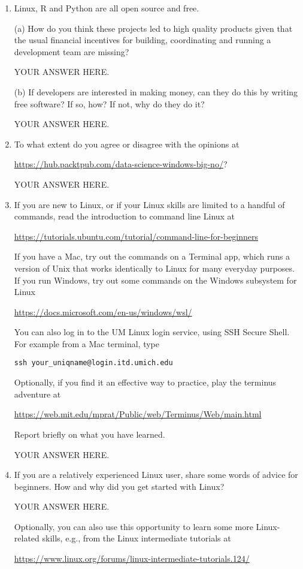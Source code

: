 \documentclass[12pt]{article}
\begin{document}
\begin{enumerate}

\item Linux, R and Python are all open source and free. 

(a) How do you think these projects led to high quality products given that the  usual financial incentives for building, coordinating and running a development team are missing?

YOUR ANSWER HERE.

(b) If developers are interested in making money, can they do this by writing free software? If so, how? If not, why do they do it?

YOUR ANSWER HERE.
  
\item To what extent do you agree or disagree with the opinions at

\url{https://hub.packtpub.com/data-science-windows-big-no/}? 

YOUR ANSWER HERE.

\item If you are new to Linux, or if your Linux skills are limited to a handful of commands, read the introduction to command line Linux at
  
\url{https://tutorials.ubuntu.com/tutorial/command-line-for-beginners}

If you have a Mac, try out the commands on a Terminal app, which runs a version of Unix that works identically to Linux for many everyday purposes. If you run Windows, try out some commands on the Windows subsystem for Linux

\url{https://docs.microsoft.com/en-us/windows/wsl/}

You can also log in to the UM Linux login service, using SSH Secure Shell. For example from a Mac terminal, type

\texttt{ssh your\_uniqname@login.itd.umich.edu}

Optionally, if you find it an effective way to practice, play the terminus adventure at

\url{https://web.mit.edu/mprat/Public/web/Terminus/Web/main.html}

Report briefly on what you have learned.

YOUR ANSWER HERE.

\item If you are a relatively experienced Linux user, share some words of advice for beginners. How and why did you get started with Linux?  

YOUR ANSWER HERE.

Optionally, you can also use this opportunity to learn some more Linux-related skills, e.g., from the Linux intermediate tutorials at

\url{https://www.linux.org/forums/linux-intermediate-tutorials.124/}


\end{enumerate}
\end{document}
